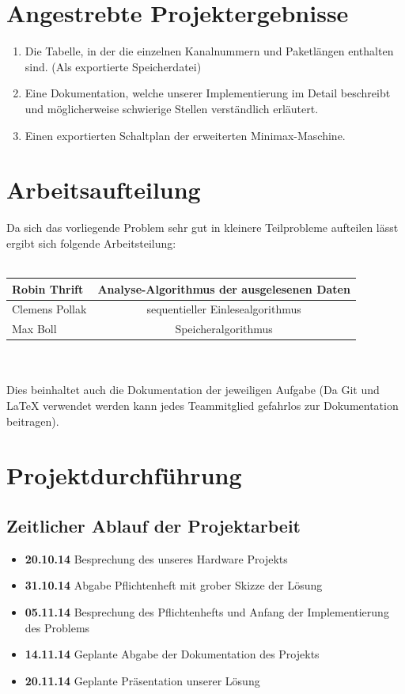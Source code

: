 \documentclass[12pt,titlepage]{article}
\begin{document}
\newpage

\section{Angestrebte Projektergebnisse}
\begin{enumerate}
\item Die Tabelle, in der die einzelnen Kanalnummern und Paketl{\"a}ngen enthalten sind. (Als exportierte Speicherdatei)
\item Eine Dokumentation, welche unserer Implementierung im Detail beschreibt und m{\"o}glicherweise schwierige Stellen verst{\"a}ndlich erl{\"a}utert.
\item Einen exportierten Schaltplan der erweiterten Minimax-Maschine.
\end{enumerate}

\section{Arbeitsaufteilung}
Da sich das vorliegende Problem sehr gut in kleinere Teilprobleme aufteilen lässt ergibt sich folgende 
Arbeitsteilung:
\leavevmode \\
\\
\begin{tabular}{|l|c|}
\hline
Robin Thrift &  Analyse-Algorithmus der ausgelesenen Daten \\
\hline
Clemens Pollak & sequentieller Einlesealgorithmus \\
\hline
Max Boll & Speicheralgorithmus \\
\hline
\end{tabular}
\leavevmode \\
\\
Dies beinhaltet auch die Dokumentation der jeweiligen Aufgabe (Da Git und LaTeX verwendet werden kann jedes 
Teammitglied gefahrlos zur Dokumentation beitragen).


\section{Projektdurchf{\"u}hrung}

\subsection{Zeitlicher Ablauf der Projektarbeit}

\begin{itemize}
\item [] \textbf{20.10.14} Besprechung des unseres Hardware Projekts
\item [] \textbf{31.10.14} Abgabe Pflichtenheft mit grober Skizze der L{\"o}sung
\item [] \textbf{05.11.14} Besprechung des Pflichtenhefts und Anfang der Implementierung des Problems
\item [] \textbf{14.11.14} Geplante Abgabe der Dokumentation des Projekts
\item [] \textbf{20.11.14} Geplante Pr{\"a}sentation unserer Lösung
\end{itemize}
\end{document}
